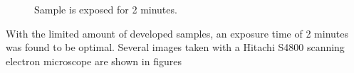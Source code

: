 \begin{figure}[H]
	\centering
	\caption{Sample is exposed for 2 minutes.}
	\label{fig:b3a1}
\end{figure}

With the limited amount of developed samples, an exposure time of 2 minutes was found to be optimal. Several images taken with a Hitachi S4800 scanning electron microscope are shown in figures 


